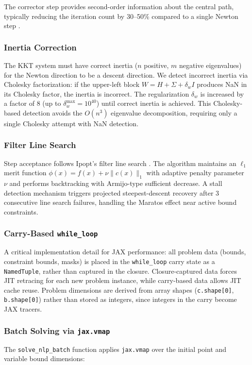 \documentclass[12pt,preprint]{article}
\begin{document}
The corrector step provides second-order information about the central path, typically reducing the iteration count by 30--50\% compared to a single Newton step \cite{Mehrotra1992}.

\subsubsection{Inertia Correction}
\label{org-inertia-correction}
The KKT system must have correct inertia ($n$ positive, $m$ negative eigenvalues) for the Newton direction to be a descent direction. We detect incorrect inertia via Cholesky factorization: if the upper-left block $W = H + \Sigma + \delta_w I$ produces NaN in its Cholesky factor, the inertia is incorrect. The regularization $\delta_w$ is increased by a factor of 8 (up to $\delta_w^{\max} = 10^{40}$) until correct inertia is achieved. This Cholesky-based detection avoids the $O(n^3)$ eigenvalue decomposition, requiring only a single Cholesky attempt with NaN detection.

\subsubsection{Filter Line Search}
\label{org-filter-line-search}
Step acceptance follows Ipopt's filter line search \cite{Wachter2006}. The algorithm maintains an $\ell_1$ merit function $\phi(x) = f(x) + \nu \|c(x)\|_1$ with adaptive penalty parameter $\nu$ and performs backtracking with Armijo-type sufficient decrease. A stall detection mechanism triggers projected steepest-descent recovery after 3 consecutive line search failures, handling the Maratos effect near active bound constraints.

\subsubsection{Carry-Based \texttt{while\_loop}}
\label{org-carry-based-while-loop}
A critical implementation detail for JAX performance: all problem data (bounds, constraint bounds, masks) is placed in the \texttt{while\_loop} carry state as a \texttt{NamedTuple}, rather than captured in the closure. Closure-captured data forces JIT retracing for each new problem instance, while carry-based data allows JIT cache reuse. Problem dimensions are derived from array shapes (\texttt{c.shape[0]}, \texttt{b.shape[0]}) rather than stored as integers, since integers in the carry become JAX tracers.

\subsubsection{Batch Solving via \texttt{jax.vmap}}
\label{org-batch-solving-via-jax-vmap}
The \texttt{solve\_nlp\_batch} function applies \texttt{jax.vmap} over the initial point and variable bound dimensions:
\end{document}
